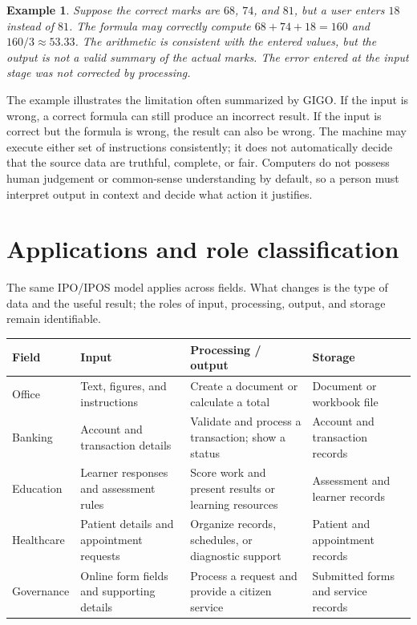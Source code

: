 \documentclass[11pt]{article}
\newtheorem{example}{Example}[section]
\begin{document}
\begin{example}
Suppose the correct marks are $68$, $74$, and $81$, but a user enters $18$
instead of $81$. The formula may correctly compute
$68+74+18=160$ and $160/3\approx 53.33$. The arithmetic is consistent with
the entered values, but the output is not a valid summary of the actual
marks. The error entered at the input stage was not corrected by processing.
\end{example}

The example illustrates the limitation often summarized by GIGO. If the
input is wrong, a correct formula can still produce an incorrect result. If
the input is correct but the formula is wrong, the result can also be wrong.
The machine may execute either set of instructions consistently; it does not
automatically decide that the source data are truthful, complete, or fair.
Computers do not possess human judgement or common-sense understanding by
default, so a person must interpret output in context and decide what action
it justifies.

\section{Applications and role classification}
The same IPO/IPOS model applies across fields. What changes is the type of
data and the useful result; the roles of input, processing, output, and
storage remain identifiable.

\begin{center}
\begin{tabular}{p{}p{}p{}p{}}
\toprule
\textbf{Field} & \textbf{Input} & \textbf{Processing / output} & \textbf{Storage}\\
\midrule
Office & Text, figures, and instructions & Create a document or calculate a total & Document or workbook file\\
Banking & Account and transaction details & Validate and process a transaction; show a status & Account and transaction records\\
Education & Learner responses and assessment rules & Score work and present results or learning resources & Assessment and learner records\\
Healthcare & Patient details and appointment requests & Organize records, schedules, or diagnostic support & Patient and appointment records\\
Governance & Online form fields and supporting details & Process a request and provide a citizen service & Submitted forms and service records\\
\bottomrule
\end{tabular}
\end{center}
\end{document}
